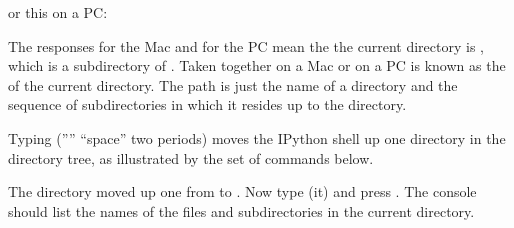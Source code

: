 \documentclass[letterpaper,10pt,english]{sphinxmanual}
\begin{document}
\begin{sphinxVerbatim}[commandchars=\\\{\}]
\end{sphinxVerbatim}

\sphinxAtStartPar
or this on a PC:

\begin{sphinxVerbatim}[commandchars=\\\{\}]
\PYGZbs{}\PYGZbs{}\PYGZbs{}\PYGZbs{}
\end{sphinxVerbatim}

\sphinxAtStartPar
The responses  for the Mac and  for the PC mean the the current directory is , which is a subdirectory of .
Taken together  on a Mac or  on a PC is known as the  of the current directory.
The path is just the name of a directory and the sequence of subdirectories in which it resides up to the  directory.

\sphinxAtStartPar
Typing  (”” \textendash{} “space” \textendash{} two periods) moves the IPython shell up one directory in the directory tree, as illustrated by the set of commands below.

\begin{sphinxVerbatim}[commandchars=\\\{\},numbers=left,firstnumber=1,stepnumber=1]
 

\end{sphinxVerbatim}

\sphinxAtStartPar
The directory moved up one from  to .  Now type  (it) and press .  The console should list the names of the files and subdirectories in the current directory.
\end{document}
